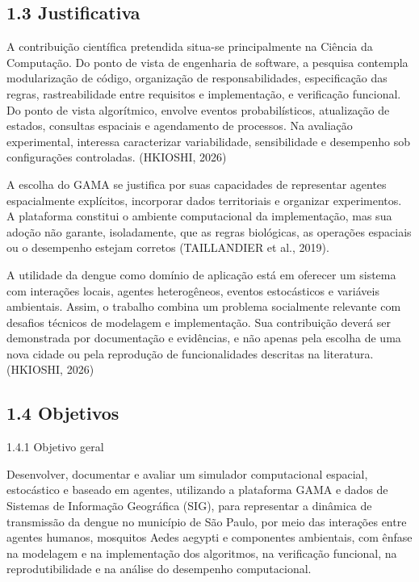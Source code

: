 \subsection{1.3 Justificativa}\label{justificativa}

A contribuição científica pretendida situa-se principalmente na Ciência
da Computação. Do ponto de vista de engenharia de software, a pesquisa
contempla modularização de código, organização de responsabilidades,
especificação das regras, rastreabilidade entre requisitos e
implementação, e verificação funcional. Do ponto de vista algorítmico,
envolve eventos probabilísticos, atualização de estados, consultas
espaciais e agendamento de processos. Na avaliação experimental,
interessa caracterizar variabilidade, sensibilidade e desempenho sob
configurações controladas. (HKIOSHI, 2026)

A escolha do GAMA se justifica por suas capacidades de representar
agentes espacialmente explícitos, incorporar dados territoriais e
organizar experimentos. A plataforma constitui o ambiente computacional
da implementação, mas sua adoção não garante, isoladamente, que as
regras biológicas, as operações espaciais ou o desempenho estejam
corretos (TAILLANDIER et al., 2019).

A utilidade da dengue como domínio de aplicação está em oferecer um
sistema com interações locais, agentes heterogêneos, eventos
estocásticos e variáveis ambientais. Assim, o trabalho combina um
problema socialmente relevante com desafios técnicos de modelagem e
implementação. Sua contribuição deverá ser demonstrada por documentação
e evidências, e não apenas pela escolha de uma nova cidade ou pela
reprodução de funcionalidades descritas na literatura. (HKIOSHI, 2026)

\subsection{1.4 Objetivos}\label{objetivos}

1.4.1 Objetivo geral

Desenvolver, documentar e avaliar um simulador computacional espacial,
estocástico e baseado em agentes, utilizando a plataforma GAMA e dados
de Sistemas de Informação Geográfica (SIG), para representar a dinâmica
de transmissão da dengue no município de São Paulo, por meio das
interações entre agentes humanos, mosquitos Aedes aegypti e componentes
ambientais, com ênfase na modelagem e na implementação dos algoritmos,
na verificação funcional, na reprodutibilidade e na análise do
desempenho computacional.

